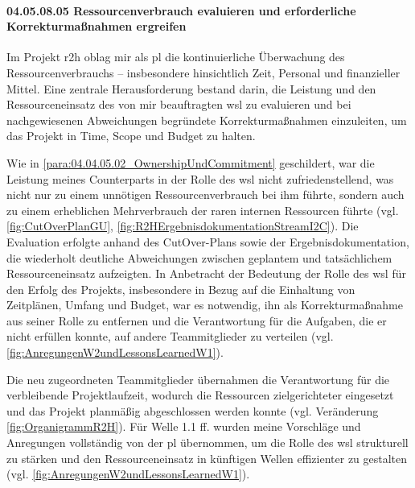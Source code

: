  \paragraph*{04.05.08.05 Ressourcenverbrauch evaluieren und erforderliche Korrekturmaßnahmen ergreifen}
\label{para:04.05.08.05_Ressourcenverbrauch}

\par Im Projekt \gls{r2h} oblag mir als \gls{pl} die kontinuierliche Überwachung des Ressourcenverbrauchs -- insbesondere hinsichtlich Zeit, Personal und finanzieller Mittel. Eine zentrale Herausforderung bestand darin, die Leistung und den Ressourceneinsatz des von mir beauftragten \gls{wsl} zu evaluieren und bei nachgewiesenen Abweichungen begründete Korrekturmaßnahmen einzuleiten, um das Projekt in Time, Scope und Budget zu halten.

\par Wie in \ref{para:04.04.05.02_OwnershipUndCommitment} geschildert, war die Leistung meines Counterparts in der Rolle des \gls{wsl} nicht zufriedenstellend, was nicht nur zu einem unnötigen Ressourcenverbrauch bei ihm führte, sondern auch zu einem erheblichen Mehrverbrauch der raren internen Ressourcen führte (vgl. \autoref{fig:CutOverPlanGU}, \autoref{fig:R2HErgebnisdokumentationStreamI2C}). Die Evaluation erfolgte anhand des CutOver-Plans sowie der Ergebnisdokumentation, die wiederholt deutliche Abweichungen zwischen geplantem und tatsächlichem Ressourceneinsatz aufzeigten. In Anbetracht der Bedeutung der Rolle des \gls{wsl} für den Erfolg des Projekts, insbesondere in Bezug auf die Einhaltung von Zeitplänen, Umfang und Budget, war es notwendig, ihn als Korrekturmaßnahme aus seiner Rolle zu entfernen und die Verantwortung für die Aufgaben, die er nicht erfüllen konnte, auf andere Teammitglieder zu verteilen (vgl. \autoref{fig:AnregungenW2undLessonsLearnedW1}).

\par Die neu zugeordneten Teammitglieder übernahmen die Verantwortung für die verbleibende Projektlaufzeit, wodurch die Ressourcen zielgerichteter eingesetzt und das Projekt planmäßig abgeschlossen werden konnte (vgl. Veränderung \autoref{fig:OrganigrammR2H}). Für Welle 1.1 ff. wurden meine Vorschläge und Anregungen vollständig von der \gls{pl} übernommen, um die Rolle des \gls{wsl} strukturell zu stärken und den Ressourceneinsatz in künftigen Wellen effizienter zu gestalten (vgl. \autoref{fig:AnregungenW2undLessonsLearnedW1}).


